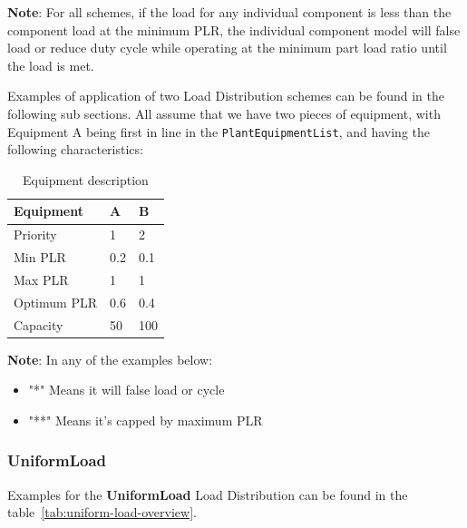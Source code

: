 \textbf{Note}: For all schemes, if the load for any individual component is less than the component load at the minimum PLR, the individual component model will false load or reduce duty cycle while operating at the minimum part load ratio until the load is met.

Examples of application of two Load Distribution schemes can be found in the following sub sections.
All assume that we have two pieces of equipment, with Equipment A being first in line in the \lstinline!PlantEquipmentList!, and having the following characteristics:

\begin{table}[htbp]
    \centering
    \caption{Equipment description}
    \label{tab:example-load-distribution-eq}
\begin{tabular}{|l|l|l|}
\hline
Equipment   & A   & B   \\ \hline
Priority    & 1   & 2   \\ \hline
Min PLR     & 0.2 & 0.1 \\ \hline
Max PLR     & 1   & 1   \\ \hline
Optimum PLR & 0.6 & 0.4 \\ \hline
Capacity    & 50  & 100 \\ \hline
\end{tabular}
\end{table}

\textbf{Note}: In any of the examples below:

\begin{itemize}
\item
    "*" Means it will false load or cycle
\item
    "**" Means it's capped by maximum PLR
\end{itemize}


\subsubsection{UniformLoad}%
\label{ssub:uniformload}

Examples for the \textbf{UniformLoad} Load Distribution can be found in the table~\ref{tab:uniform-load-overview}.


